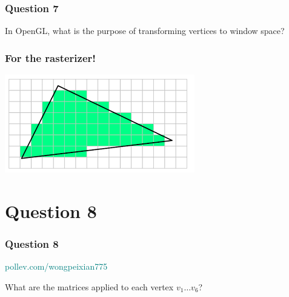 \documentclass{beamer}
\begin{document}
\begin{frame}
    \frametitle{Question 7}

    In OpenGL, what is the purpose of transforming vertices to window space?

\end{frame}

\begin{frame}
    \frametitle{For the rasterizer!}

    \begin{center}
        \includegraphics[scale=0.6]{rasterizer.png}
    \end{center}

\end{frame}

\section{Question 8}

\begin{frame}
    \frametitle{Question 8}

    \begin{tcolorbox}[colback=teal!5!white]
        \textcolor{teal}{pollev.com/wongpeixian775}
    \end{tcolorbox}

    What are the matrices applied to each vertex $v_1 \dots v_6$?

\end{frame}
\end{document}
